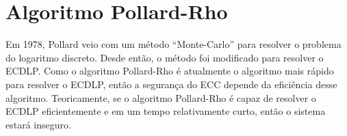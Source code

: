 \chapter{Algoritmo Pollard-Rho}
Em 1978, Pollard veio com um método ``Monte-Carlo'' para resolver o problema do logaritmo discreto. Desde então, o método foi modificado para resolver o ECDLP. Como o algoritmo Pollard-Rho é atualmente o algoritmo mais rápido para resolver o ECDLP, então a segurança do ECC depende da eficiência desse algoritmo. Teoricamente, se o algoritmo Pollard-Rho é capaz de resolver o ECDLP eficientemente e em um tempo relativamente curto, então o sistema estará inseguro. \cite{Mandy:2007}
